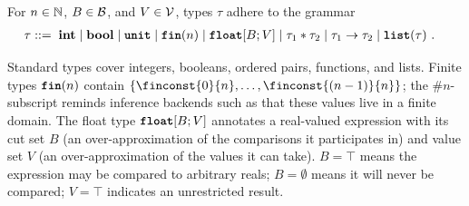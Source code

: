 %
\begin{definition}[Types]
	For $n \in \mathbb{N}$, $B \in \mathcal{B}$, and $V \in \mathcal{V}$, types $\tau$ adhere to the grammar
	\begin{align*}
		\tau {}::={} &\phantom{|} \textbf{int} 
		\mid \textbf{bool}
		\mid \textnormal{\ttfamily\bfseries unit}
		 \mid\textnormal{\ttfamily\bfseries fin}(n) 
		\mid \textnormal{\ttfamily\bfseries float}[B; V]
		 \mid \tau_1 * \tau_2 
		 \mid \tau_1 \rightarrow \tau_2 
		 \mid\textnormal{\ttfamily\bfseries list}(\tau)~.
	\end{align*}
\end{definition}
%
Standard types cover integers, booleans, ordered pairs, functions, and lists. 
Finite types $\textnormal{\ttfamily\bfseries fin}(n)$ contain $\{\finconst{0}{n},\ldots,\finconst{(n-1)}{n}\}$; the ${\#n}$-subscript reminds inference backends such as \Dice{} that these values live in a finite domain. The float type $\textnormal{\ttfamily\bfseries float}[B; V]$ annotates a real-valued expression with its cut set $B$ (an over-approximation of the comparisons it participates in) and value set $V$ (an over-approximation of the values it can take). $B=\top$ means the expression may be compared to arbitrary reals; $B=\emptyset$ means it will never be compared; $V=\top$ indicates an unrestricted result.


%

